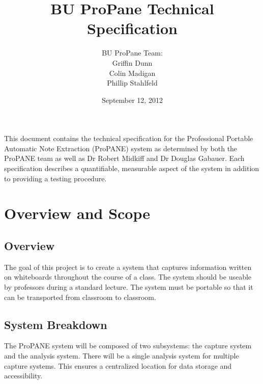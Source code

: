 \documentclass[]{article}
\begin{document}
	\begin{titlepage}



		\title{\textbf{BU ProPane Technical Specification}}
		\author{BU ProPane Team:\\Griffin Dunn\\Colin Madigan\\Phillip Stahlfeld}
		\date{September 12, 2012}
		\maketitle



		\noindent
		This document contains the technical specification for the Professional Portable Automatic Note Extraction (ProPANE) system as determined by both the ProPANE team as well as Dr Robert Midkiff and Dr Douglas Gabauer. Each specification describes a quantifiable, measurable aspect of the system in addition to providing a testing procedure. 
		\thispagestyle{empty}
		
		
		
	\end{titlepage}
	
	\thispagestyle{empty}
	
	
	\tableofcontents
	\newpage
	
	
	\setcounter{page}{1}
	\thispagestyle{empty}
	
	\section{Overview and Scope}
	
		\subsection{Overview}
			The goal of this project is to create a system that captures information written on whiteboards throughout the course of a class. The system should be useable by professors during a standard lecture. The system must be portable so that it can be transported from classroom to classroom.
			
		\subsection{System Breakdown}
			The ProPANE system will be composed of two subsystems: the capture system and the analysis system. There will be a single analysis system for multiple capture systems. This ensures a centralized location for data storage and accessibility.
			
\end{document}
